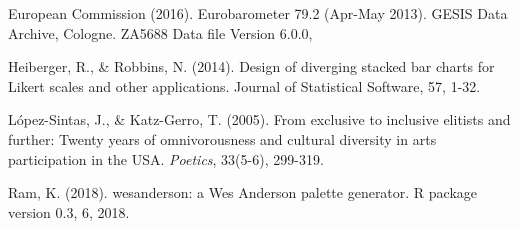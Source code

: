 \documentclass{article}
\begin{document}
European Commission (2016). Eurobarometer 79.2 (Apr-May 2013). GESIS Data Archive, Cologne. ZA5688 Data file Version 6.0.0, 

Heiberger, R., \& Robbins, N. (2014). Design of diverging stacked bar charts for Likert scales and other applications. Journal of Statistical Software, 57, 1-32.

López-Sintas, J., \& Katz-Gerro, T. (2005). From exclusive to inclusive elitists and further: Twenty years of omnivorousness and cultural diversity in arts participation in the USA. \textit{Poetics}, 33(5-6), 299-319.

Ram, K. (2018). wesanderson: a Wes Anderson palette generator. R package version 0.3, 6, 2018.
\end{document}
